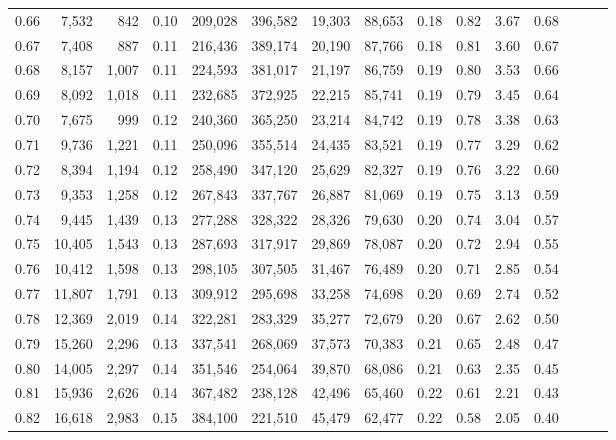 \begin{tabular}{rrrrrrrrrrrrrrr}
0.66 &   7,532 &    842 &  0.10 &  209,028 &  396,582 &   19,303 &   88,653 &  0.18 &  0.82 &  3.67 &      0.68 \\
0.67 &   7,408 &    887 &  0.11 &  216,436 &  389,174 &   20,190 &   87,766 &  0.18 &  0.81 &  3.60 &      0.67 \\
0.68 &   8,157 &  1,007 &  0.11 &  224,593 &  381,017 &   21,197 &   86,759 &  0.19 &  0.80 &  3.53 &      0.66 \\
0.69 &   8,092 &  1,018 &  0.11 &  232,685 &  372,925 &   22,215 &   85,741 &  0.19 &  0.79 &  3.45 &      0.64 \\
0.70 &   7,675 &    999 &  0.12 &  240,360 &  365,250 &   23,214 &   84,742 &  0.19 &  0.78 &  3.38 &      0.63 \\
0.71 &   9,736 &  1,221 &  0.11 &  250,096 &  355,514 &   24,435 &   83,521 &  0.19 &  0.77 &  3.29 &      0.62 \\
0.72 &   8,394 &  1,194 &  0.12 &  258,490 &  347,120 &   25,629 &   82,327 &  0.19 &  0.76 &  3.22 &      0.60 \\
0.73 &   9,353 &  1,258 &  0.12 &  267,843 &  337,767 &   26,887 &   81,069 &  0.19 &  0.75 &  3.13 &      0.59 \\
0.74 &   9,445 &  1,439 &  0.13 &  277,288 &  328,322 &   28,326 &   79,630 &  0.20 &  0.74 &  3.04 &      0.57 \\
0.75 &  10,405 &  1,543 &  0.13 &  287,693 &  317,917 &   29,869 &   78,087 &  0.20 &  0.72 &  2.94 &      0.55 \\
0.76 &  10,412 &  1,598 &  0.13 &  298,105 &  307,505 &   31,467 &   76,489 &  0.20 &  0.71 &  2.85 &      0.54 \\
0.77 &  11,807 &  1,791 &  0.13 &  309,912 &  295,698 &   33,258 &   74,698 &  0.20 &  0.69 &  2.74 &      0.52 \\
0.78 &  12,369 &  2,019 &  0.14 &  322,281 &  283,329 &   35,277 &   72,679 &  0.20 &  0.67 &  2.62 &      0.50 \\
0.79 &  15,260 &  2,296 &  0.13 &  337,541 &  268,069 &   37,573 &   70,383 &  0.21 &  0.65 &  2.48 &      0.47 \\
0.80 &  14,005 &  2,297 &  0.14 &  351,546 &  254,064 &   39,870 &   68,086 &  0.21 &  0.63 &  2.35 &      0.45 \\
0.81 &  15,936 &  2,626 &  0.14 &  367,482 &  238,128 &   42,496 &   65,460 &  0.22 &  0.61 &  2.21 &      0.43 \\
0.82 &  16,618 &  2,983 &  0.15 &  384,100 &  221,510 &   45,479 &   62,477 &  0.22 &  0.58 &  2.05 &      0.40 \\

\end{tabular}
